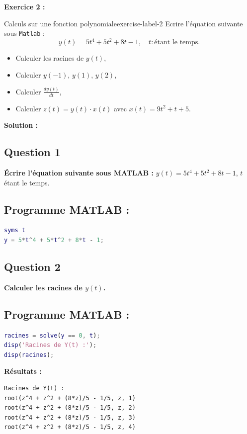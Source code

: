 \documentclass{article}
\begin{document}
\newpage

\textsf{\textbf{Exercice 2 :}}
\begin{problem}{Calculs sur une fonction polynomiale}{exercise-label-2}
Ecrire l'\'equation suivante sous \texttt{Matlab} :
\[ y(t) = 5t^4 + 5t^2 + 8t - 1, \quad t : \text{\'etant le temps.} \]
\begin{itemize}
    \item Calculer les racines de \( y(t) \),
    \item Calculer \( y(-1) \), \( y(1) \), \( y(2) \),
    \item Calculer \( \frac{dy(t)}{dt} \),
    \item Calculer \( z(t) = y(t) \cdot x(t) \) avec \( x(t) = 9t^2 + t + 5 \).
\end{itemize}
\end{problem}

\textsf{\textbf{Solution :}}

\subsection*{Question 1}
\textbf{Écrire l'équation suivante sous MATLAB :}  
\( y(t) = 5t^4 + 5t^2 + 8t - 1 \), \( t \) étant le temps.

\subsection*{Programme MATLAB :}
\begin{lstlisting}[language=Matlab]
syms t
y = 5*t^4 + 5*t^2 + 8*t - 1;
\end{lstlisting}

\subsection*{Question 2}
\textbf{Calculer les racines de \( y(t) \).}

\subsection*{Programme MATLAB :}
\begin{lstlisting}[language=Matlab]
% Calcul des racines de y(t)
racines = solve(y == 0, t);
disp('Racines de Y(t) :');
disp(racines);
\end{lstlisting}

\textbf{Résultats :}
\begin{verbatim}
Racines de Y(t) :
root(z^4 + z^2 + (8*z)/5 - 1/5, z, 1)
root(z^4 + z^2 + (8*z)/5 - 1/5, z, 2)
root(z^4 + z^2 + (8*z)/5 - 1/5, z, 3)
root(z^4 + z^2 + (8*z)/5 - 1/5, z, 4)
\end{verbatim}
\end{document}
